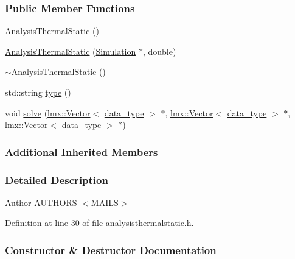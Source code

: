 \subsubsection*{Public Member Functions}
\begin{DoxyCompactItemize}
\item 
\hyperlink{classmknix_1_1_analysis_thermal_static_ae789aef70fc130d8478e09374e2541f5}{Analysis\+Thermal\+Static} ()
\item 
\hyperlink{classmknix_1_1_analysis_thermal_static_a340001a574c5c2ad92020c6bc8b99602}{Analysis\+Thermal\+Static} (\hyperlink{classmknix_1_1_simulation}{Simulation} $\ast$, double)
\item 
\hyperlink{classmknix_1_1_analysis_thermal_static_a0164991e5c2829051b9e886cb07e3af7}{$\sim$\+Analysis\+Thermal\+Static} ()
\item 
std\+::string \hyperlink{classmknix_1_1_analysis_thermal_static_a14a7b53403f7523ccb783129e928241b}{type} ()
\item 
void \hyperlink{classmknix_1_1_analysis_thermal_static_aa33ce60d449fbcffbfb0e4fdb7cfaa4a}{solve} (\hyperlink{classlmx_1_1_vector}{lmx\+::\+Vector}$<$ \hyperlink{namespacemknix_a16be4b246fbf2cceb141e3a179111020}{data\+\_\+type} $>$ $\ast$, \hyperlink{classlmx_1_1_vector}{lmx\+::\+Vector}$<$ \hyperlink{namespacemknix_a16be4b246fbf2cceb141e3a179111020}{data\+\_\+type} $>$ $\ast$, \hyperlink{classlmx_1_1_vector}{lmx\+::\+Vector}$<$ \hyperlink{namespacemknix_a16be4b246fbf2cceb141e3a179111020}{data\+\_\+type} $>$ $\ast$)
\end{DoxyCompactItemize}
\subsubsection*{Additional Inherited Members}


\subsubsection{Detailed Description}
\begin{DoxyAuthor}{Author}
A\+U\+T\+H\+O\+R\+S $<$\+M\+A\+I\+L\+S$>$ 
\end{DoxyAuthor}


Definition at line 30 of file analysisthermalstatic.\+h.



\subsubsection{Constructor \& Destructor Documentation}
\hypertarget{classmknix_1_1_analysis_thermal_static_ae789aef70fc130d8478e09374e2541f5}{}

